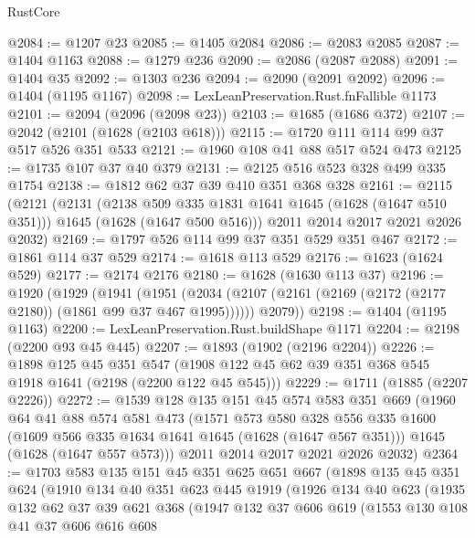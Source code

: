 \begin{lexlean}{RustCore}
\begin{coremodule}
@2084 := @1207 @23
@2085 := @1405 @2084
@2086 := @2083 @2085
@2087 := @1404 @1163
@2088 := @1279 @236
@2090 := @2086 (@2087 @2088)
@2091 := @1404 @35
@2092 := @1303 @236
@2094 := @2090 (@2091 @2092)
@2096 := @1404 (@1195 @1167)
@2098 := LexLeanPreservation.Rust.fnFallible @1173
@2101 := @2094 (@2096 (@2098 @23))
@2103 := @1685 (@1686 @372)
@2107 := @2042 (@2101 (@1628 (@2103 @618)))
@2115 := @1720 @111 @114 @99 @37 @517 @526 @351 @533
@2121 := @1960 @108 @41 @88 @517 @524 @473
@2125 := @1735 @107 @37 @40 @379
@2131 := @2125 @516 @523 @328 @499 @335 @1754
@2138 := @1812 @62 @37 @39 @410 @351 @368 @328
@2161 := @2115
    (@2121
      (@2131
        (@2138 @509 @335 @1831 @1641 @1645 (@1628 (@1647 @510 @351)))
        @1645
        (@1628 (@1647 @500 @516)))
      @2011
      @2014
      @2017
      @2021
      @2026
      @2032)
@2169 := @1797 @526 @114 @99 @37 @351 @529 @351 @467
@2172 := @1861 @114 @37 @529
@2174 := @1618 @113 @529
@2176 := @1623 (@1624 @529)
@2177 := @2174 @2176
@2180 := @1628 (@1630 @113 @37)
@2196 := @1920
    (@1929
      (@1941
        (@1951 (@2034 (@2107 (@2161 (@2169 (@2172 (@2177 @2180)) (@1861 @99 @37 @467 @1995))))))
        @2079))
@2198 := @1404 (@1195 @1163)
@2200 := LexLeanPreservation.Rust.buildShape @1171
@2204 := @2198 (@2200 @93 @45 @445)
@2207 := @1893 (@1902 (@2196 @2204))
@2226 := @1898
    @125
    @45
    @351
    @547
    (@1908 @122 @45 @62 @39 @351 @368 @545 @1918 @1641 (@2198 (@2200 @122 @45 @545)))
@2229 := @1711 (@1885 (@2207 @2226))
@2272 := @1539
    @128
    @135
    @151
    @45
    @574
    @583
    @351
    @669
    (@1960
      @64
      @41
      @88
      @574
      @581
      @473
      (@1571
        @573
        @580
        @328
        @556
        @335
        @1600
        (@1609 @566 @335 @1634 @1641 @1645 (@1628 (@1647 @567 @351)))
        @1645
        (@1628 (@1647 @557 @573)))
      @2011
      @2014
      @2017
      @2021
      @2026
      @2032)
@2364 := @1703
    @583
    @135
    @151
    @45
    @351
    @625
    @651
    @667
    (@1898
      @135
      @45
      @351
      @624
      (@1910
        @134
        @40
        @351
        @623
        @445
        @1919
        (@1926
          @134
          @40
          @623
          (@1935
            @132
            @62
            @37
            @39
            @621
            @368
            (@1947
              @132
              @37
              @606
              @619
              (@1553
                @130
                @108
                @41
                @37
                @606
                @616
                @608

\end{coremodule}
\end{lexlean}
